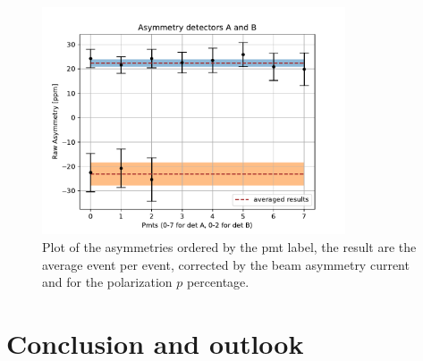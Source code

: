 \begin{figure}[hbtp]
\centering
\includegraphics[width = 0.80\textwidth]{Analysis/Dataselection/FirstResult.pdf}
\caption{Plot of the asymmetries ordered by the pmt label, the result are the average event per event, corrected by the beam asymmetry current and for the polarization $p$ percentage.}
\end{figure}


\chapter{Conclusion and outlook} \label{conclusion}

